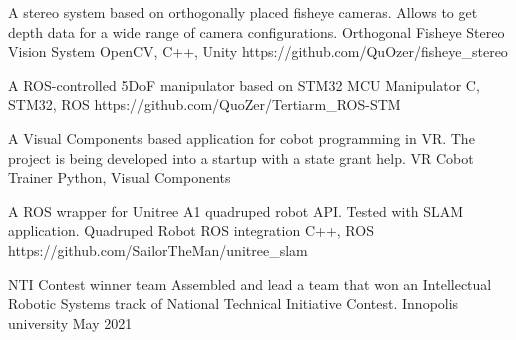 \documentclass[]{awesome-cv}
\begin{document}
\vspace{-7mm}
\begin{cventries}
	\cventry
	{A stereo system based on orthogonally placed fisheye cameras. Allows to get depth data for a wide range of camera configurations.}
	{Orthogonal Fisheye Stereo Vision System}
	{OpenCV, C++, Unity}
	{https://github.com/QuOzer/fisheye\_stereo}
	{}
	
	\vspace{-5mm}
	\cventry
	{A ROS-controlled 5DoF manipulator based on STM32 MCU}
	{Manipulator}
	{C, STM32, ROS}
	{https://github.com/QuoZer/Tertiarm\_ROS-STM}
	{}
	
	\vspace{-5mm}
	\cventry
	{A Visual Components based application for cobot programming in VR. The project is being developed into a startup with a state grant help.}
	{VR Cobot Trainer}
	{Python, Visual Components}
	{}
	{}
	
	\vspace{-5mm}
	\cventry
	{A ROS wrapper for Unitree A1 quadruped robot API. Tested with SLAM application.}
	{Quadruped Robot ROS integration}
	{C++, ROS}
	{https://github.com/SailorTheMan/unitree\_slam}
	{}
	
	\vspace{-5mm}
\end{cventries}
\begin{cvhonors}
	\cvhonor
	{NTI Contest winner team}
	{Assembled and lead a team that won an Intellectual Robotic Systems track of National Technical Initiative Contest.}
	{Innopolis university}
	{May 2021}
\end{cvhonors}
\ 
\end{document}
